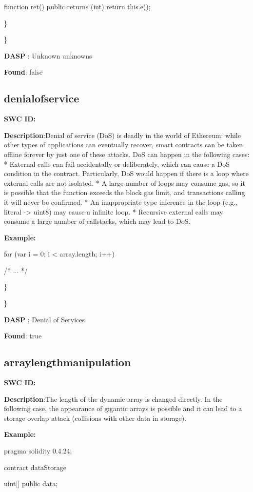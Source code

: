 \documentclass{article}
\begin{document}
{{    function ret() public returns (int){
        return this.e();
  }
}

\} 

\} 

\textbf{DASP} : Unknown unknowns

\textbf{Found}: false

\subsection{denial\textunderscore of\textunderscore service} 
\textbf{SWC \textunderscore ID:} 

\textbf{Description}:Denial of service (DoS) is deadly in the world of Ethereum: while other types of applications can eventually recover, smart contracts can be taken offline forever by just one of these attacks. DoS can happen in the following cases:
* External calls can fail accidentally or deliberately, which can cause a DoS condition in the contract. Particularly, DoS would happen if there is a loop where external calls are not isolated.
* A large number of loops may consume gas, so it is possible that the function exceeds the block gas limit, and transactions calling it will never be confirmed.
* An inappropriate type inference in the loop (e.g., literal -> uint8) may cause a infinite loop.
* Recursive external calls may consume a large number of callstacks, which may lead to DoS.


\textbf{Example:} 

for (var i = 0; i < array.length; i++) { /* ... */

\} 

\} 

\textbf{DASP} : Denial of Services

\textbf{Found}: true

\subsection{array\textunderscore length\textunderscore manipulation} 
\textbf{SWC \textunderscore ID:} 

\textbf{Description}:The length of the dynamic array is changed directly. In the following case, the appearance of gigantic arrays is possible and it can lead to a storage overlap attack (collisions with other data in storage).


\textbf{Example:} 

pragma solidity 0.4.24;

contract dataStorage {
    uint[] public data;

}}}
\end{document}
